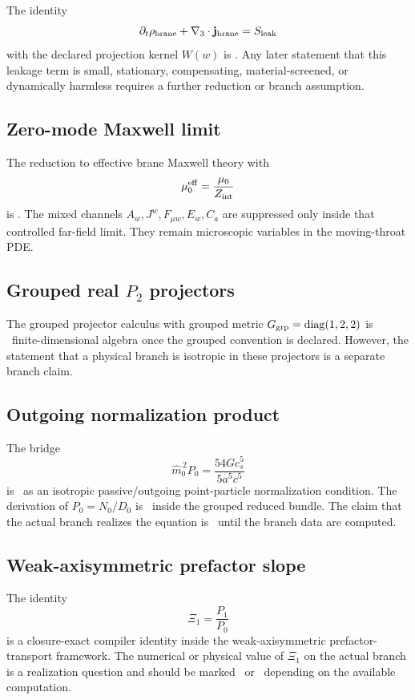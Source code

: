 The identity
\[
\partial_t\rho_{\rm brane}+\nabla_3\cdot\mathbf j_{\rm brane}=S_{\rm leak}
\]
with the declared projection kernel \(W(w)\) is \StatusExact.  Any later statement that this leakage term is small, stationary, compensating, material-screened, or dynamically harmless requires a further reduction or branch assumption.

\subsection{Zero-mode Maxwell limit}
\label{subsec:status-zero-mode-maxwell}

The reduction to effective brane Maxwell theory with
\[
\mu_0^{\rm eff}=\frac{\mu_0}{Z_{\rm int}}
\]
is \StatusReduced.  The mixed channels \(A_w,J^w,F_{\mu w},E_w,C_a\) are suppressed only inside that controlled far-field limit.  They remain microscopic variables in the moving-throat PDE.

\subsection{Grouped real \texorpdfstring{\(P_2\)}{P2} projectors}
\label{subsec:status-p2-projectors}

The grouped projector calculus with grouped metric \(G_{\rm grp}=\mathrm{diag}(1,2,2)\) is \StatusExact\ finite-dimensional algebra once the grouped convention is declared.  However, the statement that a physical branch is isotropic in these projectors is a separate branch claim.

\subsection{Outgoing normalization product}
\label{subsec:status-outgoing-normalization-product}

The bridge
\[
\widehat m_0^{\,2}P_0
=
\frac{54Gc_s^5}{5a^5c^5}
\]
is \StatusReduced\ as an isotropic passive/outgoing point-particle normalization condition.  The derivation of \(P_0=N_0/D_0\) is \StatusExactClosure\ inside the grouped reduced bundle.  The claim that the actual branch realizes the equation is \StatusOpen\ until the branch data are computed.

\subsection{Weak-axisymmetric prefactor slope}
\label{subsec:status-xi1}

The identity
\[
\Xi_1=\frac{P_1}{P_0}
\]
is a closure-exact compiler identity inside the weak-axisymmetric prefactor-transport framework.  The numerical or physical value of \(\Xi_1\) on the actual branch is a realization question and should be marked \StatusOpen\ or \StatusNumerical\ depending on the available computation.

